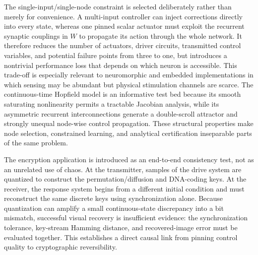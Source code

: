\documentclass[10pt,twocolumn]{article}
\newcommand{\rev}[1]{{\color{revisionblue}#1}}
\theoremstyle{definition}
\begin{document}
\rev{The single-input/single-node constraint is selected deliberately rather than merely for convenience. A multi-input controller can inject corrections directly into every state, whereas one pinned scalar actuator must exploit the recurrent synaptic couplings in $W$ to propagate its action through the whole network. It therefore reduces the number of actuators, driver circuits, transmitted control variables, and potential failure points from three to one, but introduces a nontrivial performance loss that depends on which neuron is accessible. This trade-off is especially relevant to neuromorphic and embedded implementations in which sensing may be abundant but physical stimulation channels are scarce. The continuous-time Hopfield model is an informative test bed because its smooth saturating nonlinearity permits a tractable Jacobian analysis, while its asymmetric recurrent interconnections generate a double-scroll attractor and strongly unequal node-wise control propagation. These structural properties make node selection, constrained learning, and analytical certification inseparable parts of the same problem.}

\rev{The encryption application is introduced as an end-to-end consistency test, not as an unrelated use of chaos. At the transmitter, samples of the drive system are quantized to construct the permutation/diffusion and DNA-coding keys. At the receiver, the response system begins from a different initial condition and must reconstruct the same discrete keys using synchronization alone. Because quantization can amplify a small continuous-state discrepancy into a bit mismatch, successful visual recovery is insufficient evidence: the synchronization tolerance, key-stream Hamming distance, and recovered-image error must be evaluated together. This establishes a direct causal link from pinning control quality to cryptographic reversibility.}
\end{document}
